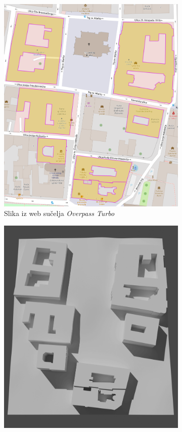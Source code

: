 \documentclass[times, utf8, zavrsni, numeric]{fer}
\begin{document}
		\begin{figure}[h]
			\centering
			\begin{subfigure}{.5\textwidth}
				\includegraphics[width=.975\linewidth,left]{figures/relations_upper_town_map.png}
				\caption{Slika iz web sučelja \textit{Overpass Turbo}}
				\label{fig:relations_upper_town_map}
			\end{subfigure}%
			\begin{subfigure}{.5\textwidth}
				\includegraphics[width=.975\linewidth,right]{figures/relations_upper_town_render.png}

\end{subfigure}
\end{figure}
\end{document}
